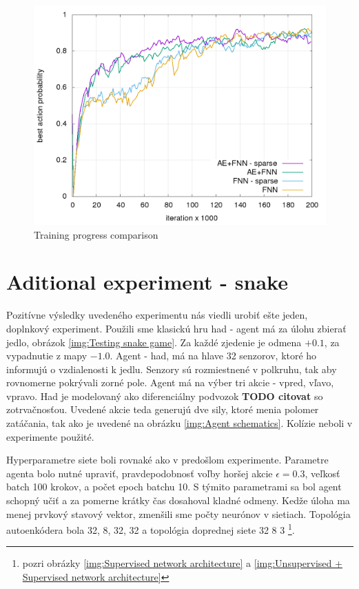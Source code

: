 \documentclass[10pt,a4paper]{article}
\begin{document}
\begin{figure}[!h]
  \centering
  \includegraphics[scale=0.4]{../../results/rl_arcade/training_progress.png}
  \caption{Training progress comparison}
  \label{img:Training progress comparison}
\end{figure}



\newpage
\section{Aditional experiment - snake}

Pozitívne výsledky uvedeného experimentu nás viedli urobiť ešte jeden, doplnkový experiment.
Použili sme klasickú hru had - agent má za úlohu zbierať jedlo, obrázok \ref{img:Testing snake game}.
Za každé zjedenie je odmena $+0.1$, za vypadnutie z mapy $-1.0$. Agent - had, má na
hlave 32 senzorov, ktoré ho informujú o vzdialenosti k jedlu. Senzory sú rozmiestnené
v polkruhu, tak aby rovnomerne pokrývali zorné pole.
Agent má na výber tri akcie - vpred, vľavo, vpravo. Had je modelovaný ako diferenciálny
podvozok {\bf TODO citovat} so zotrvačnosťou. Uvedené akcie teda generujú dve sily, ktoré
menia polomer zatáčania, tak ako je uvedené na obrázku \ref{img:Agent schematics}.
Kolízie neboli v experimente použité.

Hyperparametre siete boli rovnaké ako v predošlom experimente.
Parametre agenta bolo nutné upraviť, pravdepodobnosť voľby horšej akcie $\epsilon = 0.3$,
veľkosť batch 100 krokov, a počet epoch batchu 10. S týmito parametrami sa bol agent schopný
učiť a za pomerne krátky čas dosahoval kladné odmeny.
Kedže úloha ma menej prvkový stavový vektor, zmenšili sme počty neurónov v sietiach.
Topológia autoenkódera bola 32, 8, 32, 32 a topológia doprednej siete
32 8 3 \footnote {pozri obrázky \ref{img:Supervised network architecture} a \ref{img:Unsupervised + Supervised network architecture}}.
\end{document}
